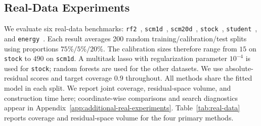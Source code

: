 \subsection{Real-Data Experiments}
\label{sec:real-data-experiments}

We evaluate six real-data benchmarks:
\texttt{rf2}~\citep{grigorios_tsoumakas_eleftherios_spyromitros-xioufis_william_groves_ioannis_vlahavas_2022},
\texttt{scm1d}~\citep{scm1d}, \texttt{scm20d}~\citep{scm20d},
\texttt{stock}~\citep{stock_portfolio_performance_390},
\texttt{student}~\citep{cortez2008student}, and
\texttt{energy}~\citep{tsanas2012energy}. Each result averages 200 random
training/calibration/test splits using proportions $75\%/5\%/20\%$. The
calibration sizes therefore range from $15$ on \texttt{stock} to $490$ on
\texttt{scm1d}. A multitask lasso with regularization parameter $10^{-4}$ is
used for \texttt{stock}; random forests are used for the other datasets. We use
absolute-residual scores and target coverage $0.9$ throughout. All methods
share the fitted model in each split. We report joint coverage,
residual-space volume, and construction time here; coordinate-wise
comparisons and search diagnostics appear in
Appendix~\ref{app:additional-real-experiments}.
Table~\ref{tab:real-data} reports coverage and residual-space volume for the
four primary methods.

